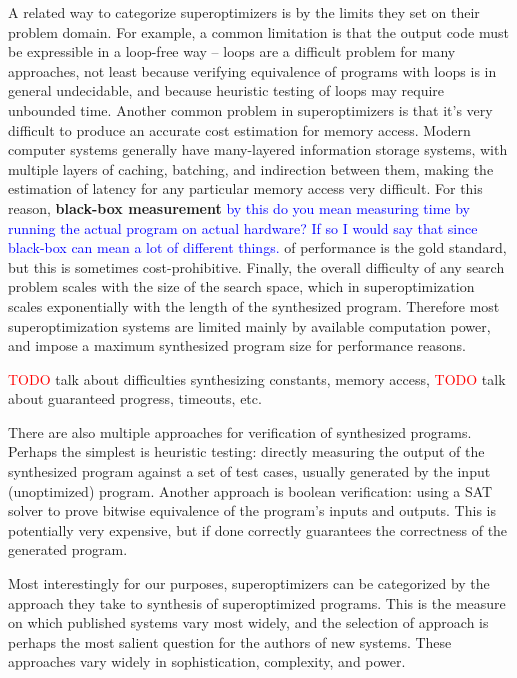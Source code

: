 \documentclass[12pt,twoside]{reedthesis}
\newcommand{\red}[1]{\textcolor{red}{#1}}
\newcommand{\comment}[2]{\textbf{#1} \textcolor{blue}{#2}}
\begin{document}
    A related way to categorize superoptimizers is by the limits they set on their problem domain.
    For example, a common limitation is that the output code must be expressible in a loop-free way
        -- loops are a difficult problem for many approaches,
            not least because verifying equivalence of programs with loops is in general undecidable,
            and because heuristic testing of loops may require unbounded time.
    Another common problem in superoptimizers is that it's very difficult to produce an accurate cost estimation for memory access.
        Modern computer systems generally have many-layered information storage systems, with multiple layers of caching, batching, and indirection between them, making the estimation of latency for any particular memory access very difficult.
        For this reason, \comment{black-box measurement}{by this do you mean measuring time by running the actual program on actual hardware? If so I would say that since black-box can mean a lot of different things.} of performance is the gold standard, but this is sometimes cost-prohibitive.
    Finally, the overall difficulty of any search problem scales with the size of the search space, which in superoptimization scales exponentially with the length of the synthesized program.
        Therefore most superoptimization systems are limited mainly by available computation power, and impose a maximum synthesized program size for performance reasons.
    
    \red{TODO} talk about difficulties synthesizing constants, memory access, %
    \red{TODO} talk about guaranteed progress, timeouts, etc.
    
    There are also multiple approaches for verification of synthesized programs.
    Perhaps the simplest is heuristic testing: 
        directly measuring the output of the synthesized program against a set of test cases, usually generated by the input (unoptimized) program.
    Another approach is boolean verification: using a SAT solver to prove bitwise equivalence of the program's inputs and outputs.
    This is potentially very expensive, but if done correctly guarantees the correctness of the generated program. 
    
    Most interestingly for our purposes, superoptimizers can be categorized by the approach they take to synthesis of superoptimized programs.
    This is the measure on which published systems vary most widely, and the selection of approach is perhaps the most salient question for the authors of new systems.
    These approaches vary widely in sophistication, complexity, and power.
    
\end{document}
